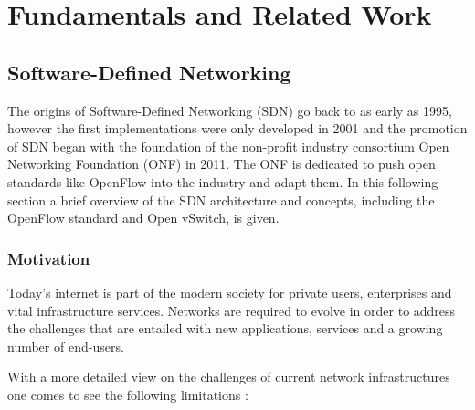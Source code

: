 \chapter{Fundamentals and Related Work}

\section{Software-Defined Networking}

The origins of Software-Defined Networking (SDN) go back to as early as 1995, however the first implementations were only developed in 2001 and the promotion of SDN began with the foundation of the non-profit industry consortium Open Networking Foundation (ONF) in 2011. \cite{roadtosdn}
The ONF is dedicated to push open standards like OpenFlow into the industry and adapt them.
In this following section a brief overview of the SDN architecture and concepts, including the OpenFlow standard and Open vSwitch, is given.

\subsection{Motivation}

Today's internet is part of the modern society for private users, enterprises and vital infrastructure services. Networks are required to evolve in order to address the challenges that are entailed with new applications, services and a growing number of end-users.

With a more detailed view on the challenges of current network infrastructures one comes to see the following limitations \cite{onfnewnorm}:


